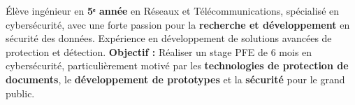 
\begin{cvparagraph}

    Élève ingénieur en \textbf{5ᵉ année} en Réseaux et Télécommunications, spécialisé en cybersécurité, avec une forte passion pour la \textbf{recherche et développement} en sécurité des données. Expérience en développement de solutions avancées de protection et détection.
    \newline
    \textbf{Objectif :} Réaliser un stage PFE de 6 mois en cybersécurité, particulièrement motivé par les \textbf{technologies de protection de documents}, le \textbf{développement de prototypes} et la \textbf{sécurité} pour le grand public.

\end{cvparagraph}